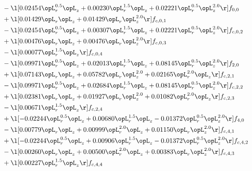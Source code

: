 \begin{alignat}{2}
& - \l[  0.02454 \opL_r^{0.5} \opL_z +  0.00230 \opL_r^{1.5} \opL_z +  0.02221 \opL_r^{0.5} \opL_z^{2.0}  \r] f_{0,0} \nonumber \\ 
& + \l[  0.01429 \opL_r \opL_z +  0.01429 \opL_r \opL_z^{2.0}  \r] f_{c,0,1} \nonumber \\ 
& - \l[  0.02454 \opL_r^{0.5} \opL_z +  0.00307 \opL_r^{1.5} \opL_z +  0.02221 \opL_r^{0.5} \opL_z^{2.0}  \r] f_{c,0,2} \nonumber \\ 
& + \l[  0.00476 \opL_r \opL_z +  0.00476 \opL_r \opL_z^{2.0}  \r] f_{c,0,3} \nonumber \\ 
& - \l[  0.00077 \opL_r^{1.5} \opL_z  \r] f_{c,0,4} \nonumber \\ 
& - \l[  0.09971 \opL_r^{0.5} \opL_z +  0.02013 \opL_r^{1.5} \opL_z +  0.08145 \opL_r^{0.5} \opL_z^{2.0}  \r] f_{2,0} \nonumber \\ 
& + \l[  0.07143 \opL_r \opL_z +  0.05782 \opL_r \opL_z^{2.0} +  0.02165 \opL_r^{2.0} \opL_z  \r] f_{c,2,1} \nonumber \\ 
& - \l[  0.09971 \opL_r^{0.5} \opL_z +  0.02684 \opL_r^{1.5} \opL_z +  0.08145 \opL_r^{0.5} \opL_z^{2.0}  \r] f_{c,2,2} \nonumber \\ 
& + \l[  0.02381 \opL_r \opL_z +  0.01927 \opL_r \opL_z^{2.0} +  0.01082 \opL_r^{2.0} \opL_z  \r] f_{c,2,3} \nonumber \\ 
& - \l[  0.00671 \opL_r^{1.5} \opL_z  \r] f_{c,2,4} \nonumber \\ 
& + \l[  -0.02244 \opL_r^{0.5} \opL_z +  0.00680 \opL_r^{1.5} \opL_z   -0.01372 \opL_r^{0.5} \opL_z^{2.0}  \r] f_{4,0} \nonumber \\ 
& - \l[  0.00779 \opL_r \opL_z +  0.00999 \opL_r^{2.0} \opL_z +  0.01150 \opL_r \opL_z^{2.0}  \r] f_{c,4,1} \nonumber \\ 
& + \l[  -0.02244 \opL_r^{0.5} \opL_z +  0.00906 \opL_r^{1.5} \opL_z   -0.01372 \opL_r^{0.5} \opL_z^{2.0}  \r] f_{c,4,2} \nonumber \\ 
& - \l[  0.00260 \opL_r \opL_z +  0.00500 \opL_r^{2.0} \opL_z +  0.00383 \opL_r \opL_z^{2.0}  \r] f_{c,4,3} \nonumber \\ 
& + \l[  0.00227 \opL_r^{1.5} \opL_z  \r] f_{c,4,4} \nonumber \\ 
\end{alignat} 


